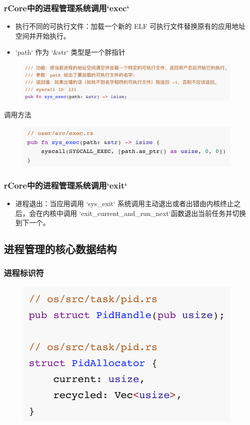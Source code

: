 \begin{frame}[fragile]
    \frametitle{rCore中的进程管理系统调用`exec`}
    \begin{itemize}
        \item 执行不同的可执行文件：加载一个新的 ELF 可执行文件替换原有的应用地址空间并开始执行。
        \item `path` 作为 `\&str` 类型是一个胖指针
    \end{itemize}
% 
	\begin{figure}
		\centering
		\includegraphics[width=0.7\linewidth]{figs/exec.png}
	\end{figure}



% 
调用方法
% 
	\begin{figure}
		\centering
		\includegraphics[width=0.7\linewidth]{figs/exec-call.png}
	\end{figure}



% 
\end{frame}
\begin{frame}[fragile]
    \frametitle{rCore中的进程管理系统调用`exit`}
    \begin{itemize}
        \item 进程退出：当应用调用 `sys\_exit` 系统调用主动退出或者出错由内核终止之后，会在内核中调用 `exit\_current\_and\_run\_next`函数退出当前任务并切换到下一个。
    \end{itemize}
% 
% 
% 
\subsection{进程管理的核心数据结构}
% 
\end{frame}
\begin{frame}[fragile]
    \frametitle{进程标识符}
% 
	\begin{figure}
		\centering
		\includegraphics[width=0.6\linewidth]{figs/pid.png}
	\end{figure}


% 
\end{frame}
